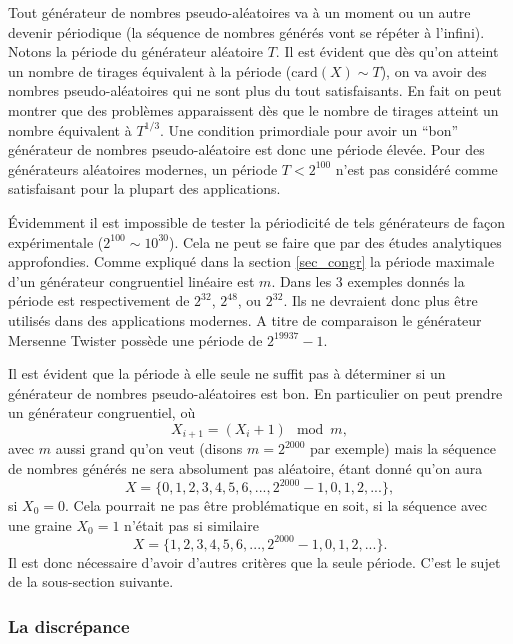 \documentclass[a4paper,12pt]{book}
\newcommand{\card}{\mathrm{card}}
\begin{document}
Tout générateur de nombres pseudo-aléatoires va à un moment ou un autre devenir périodique (la séquence de nombres générés vont 
se répéter à l'infini). Notons la période du générateur aléatoire $T$. 
Il est évident que dès qu'on atteint un nombre de tirages équivalent à la période ($\card(X)\sim T$), on va avoir des nombres 
pseudo-aléatoires qui ne sont plus du tout satisfaisants. En fait on peut montrer que des problèmes apparaissent dès que
le nombre de tirages atteint un nombre équivalent à $T^{1/3}$. 
Une condition primordiale pour avoir un ``bon'' générateur de nombres pseudo-aléatoire est donc une période élevée.
Pour des générateurs aléatoires modernes, 
un période $T<2^{100}$ n'est pas considéré comme satisfaisant pour la plupart des applications.

Évidemment il est impossible de tester la périodicité de tels générateurs de façon 
expérimentale ($2^{100}\sim 10^{30}$). Cela ne peut se faire que par des études analytiques
approfondies. Comme expliqué dans la section \ref{sec_congr}
la période maximale d'un générateur congruentiel linéaire est $m$. Dans les 3 exemples
donnés la période est respectivement de $2^{32}$, $2^{48}$, ou $2^{32}$. Ils ne devraient donc
plus être utilisés dans des applications modernes. A titre de comparaison le générateur Mersenne Twister possède une période de $2^{19937}-1$.

Il est évident que la période à elle seule ne suffit pas à déterminer si un 
générateur de nombres pseudo-aléatoires est bon. En particulier on peut prendre un générateur congruentiel, où 
\begin{equation}
 X_{i+1}=(X_i+1)\mod m,
\end{equation}
avec $m$ aussi grand qu'on veut (disons $m=2^{2000}$ par exemple) mais la séquence de
nombres générés ne sera absolument pas aléatoire, étant donné qu'on aura
\begin{equation}
 X=\{0, 1, 2, 3, 4, 5, 6, ..., 2^{2000}-1, 0, 1, 2, ...\},
\end{equation}
si $X_0=0$. Cela pourrait ne pas être problématique en soit, si la séquence avec une graine $X_0=1$ n'était pas si similaire
\begin{equation}
 X=\{1, 2, 3, 4, 5, 6, ..., 2^{2000}-1, 0, 1, 2, ...\}.
\end{equation}
Il est donc nécessaire d'avoir d'autres critères que la seule période.
C'est le sujet de la sous-section suivante.

\subsubsection{La discrépance}
\end{document}
